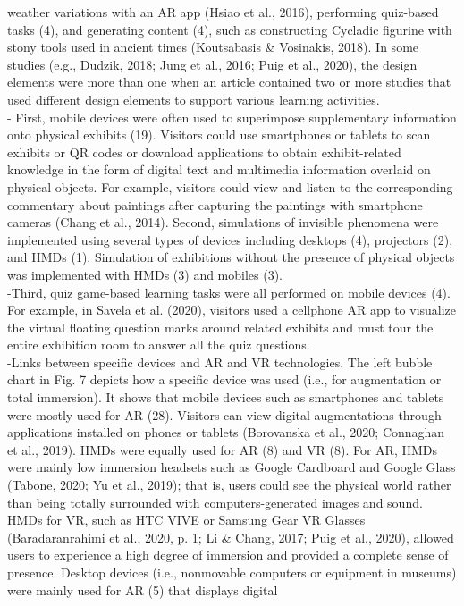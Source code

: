 weather variations with an AR app (Hsiao et al., 2016), performing quiz-based tasks (4), and generating content (4), such as constructing
Cycladic figurine with stony tools used in ancient times (Koutsabasis & Vosinakis, 2018). In some studies (e.g., Dudzik, 2018;
Jung et al., 2016; Puig et al., 2020), the design elements were more than one when an article contained two or more studies that used
different design elements to support various learning activities.
\\
- First, mobile devices were often used to superimpose supplementary information onto physical
exhibits (19). Visitors could use smartphones or tablets to scan exhibits or QR codes or download applications to obtain exhibit-related
knowledge in the form of digital text and multimedia information overlaid on physical objects. For example, visitors could view and
listen to the corresponding commentary about paintings after capturing the paintings with smartphone cameras (Chang et al., 2014).
Second, simulations of invisible phenomena were implemented using several types of devices including desktops (4), projectors (2),
and HMDs (1). Simulation of exhibitions without the presence of physical objects was implemented with HMDs (3) and mobiles (3).
\\
-Third, quiz game-based learning tasks were all performed on mobile devices (4). For example, in Savela et al. (2020), visitors used a
cellphone AR app to visualize the virtual floating question marks around related exhibits and must tour the entire exhibition room to
answer all the quiz questions.
\\
-Links between specific devices and AR and VR technologies. The left bubble chart in Fig. 7 depicts how a specific device was
used (i.e., for augmentation or total immersion). It shows that mobile devices such as smartphones and tablets were mostly used for AR
(28). Visitors can view digital augmentations through applications installed on phones or tablets (Borovanska et al., 2020; Connaghan
et al., 2019).
HMDs were equally used for AR (8) and VR (8). For AR, HMDs were mainly low immersion headsets such as Google Cardboard and
Google Glass (Tabone, 2020; Yu et al., 2019); that is, users could see the physical world rather than being totally surrounded with
computers-generated images and sound. HMDs for VR, such as HTC VIVE or Samsung Gear VR Glasses (Baradaranrahimi et al., 2020,
p. 1; Li & Chang, 2017; Puig et al., 2020), allowed users to experience a high degree of immersion and provided a complete sense of
presence. Desktop devices (i.e., nonmovable computers or equipment in museums) were mainly used for AR (5) that displays digital
